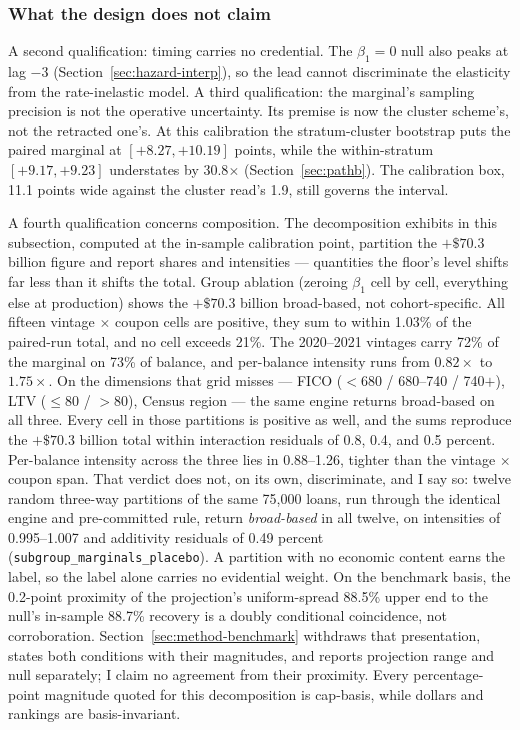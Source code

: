 \documentclass[12pt]{article}
\begin{document}
\subsubsection{What the design does not claim}

A second qualification: timing carries no credential. The $\beta_1 = 0$ null also peaks at lag $-3$ (Section~\ref{sec:hazard-interp}), so the lead cannot discriminate the elasticity from the rate-inelastic model. A third qualification: the marginal's sampling precision is not the operative uncertainty. Its premise is now the cluster scheme's, not the retracted one's. At this calibration the stratum-cluster bootstrap puts the paired marginal at $[+8.27, +10.19]$ points, while the within-stratum $[+9.17, +9.23]$ understates by 30.8$\times$ (Section~\ref{sec:pathb}). The calibration box, 11.1 points wide against the cluster read's 1.9, still governs the interval.

A fourth qualification concerns composition. The decomposition exhibits in this subsection, computed at the in-sample calibration point, partition the $+\$70.3$ billion figure and report shares and intensities --- quantities the floor's level shifts far less than it shifts the total. Group ablation (zeroing $\beta_1$ cell by cell, everything else at production) shows the $+\$70.3$ billion broad-based, not cohort-specific. All fifteen vintage $\times$ coupon cells are positive, they sum to within 1.03\% of the paired-run total, and no cell exceeds 21\%. The 2020--2021 vintages carry 72\% of the marginal on 73\% of balance, and per-balance intensity runs from $0.82\times$ to $1.75\times$. On the dimensions that grid misses --- FICO ($<$680 / 680--740 / 740$+$), LTV ($\leq$80 / $>$80), Census region --- the same engine returns broad-based on all three. Every cell in those partitions is positive as well, and the sums reproduce the $+\$70.3$ billion total within interaction residuals of 0.8, 0.4, and 0.5 percent. Per-balance intensity across the three lies in 0.88--1.26, tighter than the vintage $\times$ coupon span. That verdict does not, on its own, discriminate, and I say so: twelve random three-way partitions of the same 75,000 loans, run through the identical engine and pre-committed rule, return \emph{broad-based} in all twelve, on intensities of 0.995--1.007 and additivity residuals of 0.49 percent (\texttt{subgroup\_marginals\_placebo}). A partition with no economic content earns the label, so the label alone carries no evidential weight. On the benchmark basis, the 0.2-point proximity of the projection's uniform-spread 88.5\% upper end to the null's in-sample 88.7\% recovery is a doubly conditional coincidence, not corroboration. Section~\ref{sec:method-benchmark} withdraws that presentation, states both conditions with their magnitudes, and reports projection range and null separately; I claim no agreement from their proximity. Every percentage-point magnitude quoted for this decomposition is cap-basis, while dollars and rankings are basis-invariant.
\end{document}
